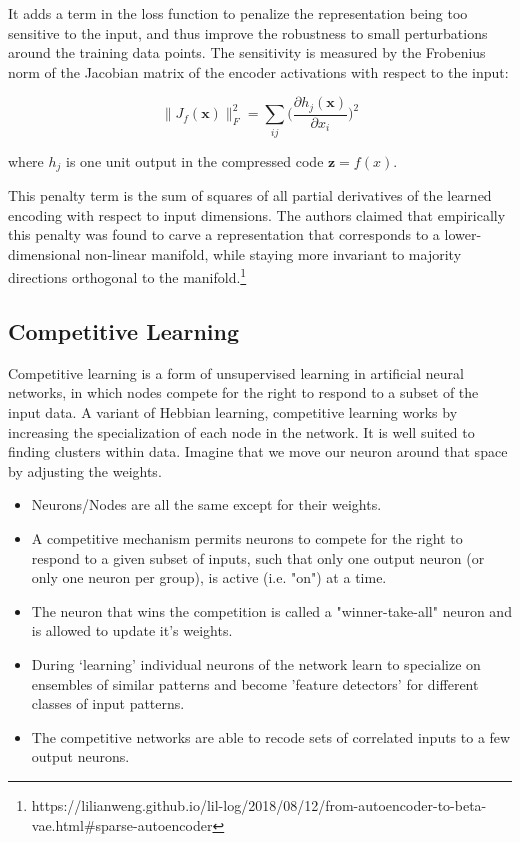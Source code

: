 \documentclass[main]{subfiles}
\begin{document}
It adds a term in the loss function to penalize the representation being too sensitive to the input, and thus improve the robustness to small perturbations around the training data points. The sensitivity is measured by the Frobenius norm of the Jacobian matrix of the encoder activations with respect to the input:

\begin{equation}
    \|J_f(\mathbf{x})\|_F^2 = \sum_{ij} \Big( \frac{\partial h_j(\mathbf{x})}{\partial x_i} \Big)^2
\end{equation}

where $h_j$ is one unit output in the compressed code $\mathbf{z} = f(x)$.

This penalty term is the sum of squares of all partial derivatives of the learned encoding with respect to input dimensions. The authors claimed that empirically this penalty was found to carve a representation that corresponds to a lower-dimensional non-linear manifold, while staying more invariant to majority directions orthogonal to the manifold.\footnote{https://lilianweng.github.io/lil-log/2018/08/12/from-autoencoder-to-beta-vae.html#sparse-autoencoder}
\subsection{Competitive Learning}
Competitive learning is a form of unsupervised learning in artificial neural networks, in which nodes compete for the right to respond to a subset of the input data. A variant of Hebbian learning, competitive learning works by increasing the specialization of each node in the network. It is well suited to finding clusters within data. Imagine that we move our neuron around that space by adjusting the weights.

\begin{itemize}
    \item Neurons/Nodes are all the same except for their weights.
    \item A competitive mechanism permits neurons to compete for the right to respond to a given subset of inputs, such that only one output neuron (or only one neuron per group), is active (i.e. "on") at a time.
    \item The neuron that wins the competition is called a "winner-take-all" neuron and is allowed to update it’s weights.
    \item During ‘learning’ individual neurons of the network learn to specialize on ensembles of similar patterns and become 'feature detectors' for different classes of input patterns.
    \item The competitive networks are able to recode sets of correlated inputs to a few output neurons.
\end{itemize}
\end{document}

